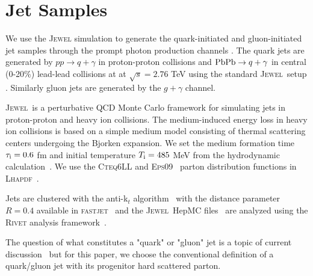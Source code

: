 \documentclass[notoc]{JHEP3}
\newcommand{\text}[1]{{\rm #1}}
\newcommand{\jw}{\textsc{Jewel}~}
\begin{document}
\section{Jet Samples}
\label{sec:sample}

We use the \textsc{Jewel} simulation to generate the quark-initiated and gluon-initiated jet samples through the prompt photon production channels \cite{}. The quark jets are generated by $pp\rightarrow q +\gamma$ in proton-proton collisions and ${\rm PbPb}\rightarrow q+\gamma$ in central (0-20\%) lead-lead collisions at at $\sqrt{s} = 2.76$ TeV using the standard \jw setup \cite{Zapp:2013zya}. Similarly gluon jets are generated by the $g +\gamma$ channel.

\jw is a perturbative QCD Monte Carlo framework for simulating jets in proton-proton and heavy ion collisions. The medium-induced energy loss in heavy ion collisions is based on a simple medium model consisting of thermal scattering centers undergoing the Bjorken expansion. We set the medium formation time $\tau_\text{i}=0.6 $ fm and initial temperature $T_\text{i}=485$ MeV from the hydrodynamic calculation~\cite{Shen:2012vn,Shen:2014vra}. We use the \textsc{Cteq6LL} \cite{Pumplin:2002vw} and \textsc{Eps09}~\cite{Eskola:2009uj} parton distribution functions in \textsc{Lhapdf}~\cite{Whalley:2005nh}.




	Jets are clustered with the anti-k$_{t}$ algorithm~\cite{} with the distance parameter $R = 0.4$ available in \textsc{fastjet}~\cite{} and the \jw HepMC files~\cite{} are analyzed using the \textsc{Rivet} analysis framework~\cite{}.

The question of what constitutes a "quark" or "gluon" jet is a topic of current discussion~\cite{} but for this paper, we choose the conventional definition of a quark/gluon jet with its progenitor hard scattered parton.
\end{document}
